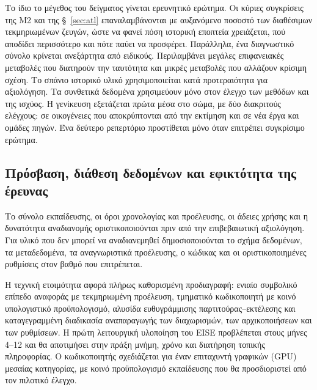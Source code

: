 \documentclass[11pt,a4paper]{article}
\begin{document}
Το ίδιο το μέγεθος του δείγματος γίνεται ερευνητικό ερώτημα. Οι κύριες συγκρίσεις της M2 και της §~\ref{sec:atl} επαναλαμβάνονται με αυξανόμενο ποσοστό των διαθέσιμων τεκμηριωμένων ζευγών, ώστε να φανεί πόση ιστορική εποπτεία χρειάζεται, πού αποδίδει περισσότερο και πότε παύει να προσφέρει. Παράλληλα, ένα διαγνωστικό σύνολο κρίνεται ανεξάρτητα από ειδικούς. Περιλαμβάνει μεγάλες επιφανειακές μεταβολές που διατηρούν την ταυτότητα και μικρές μεταβολές που αλλάζουν κρίσιμη σχέση. Το σπάνιο ιστορικό υλικό χρησιμοποιείται κατά προτεραιότητα για αξιολόγηση. Τα συνθετικά δεδομένα χρησιμεύουν μόνο στον έλεγχο των μεθόδων και της ισχύος. Η γενίκευση εξετάζεται πρώτα μέσα στο σώμα, με δύο διακριτούς ελέγχους: σε οικογένειες που αποκρύπτονται από την εκτίμηση και σε νέα έργα και ομάδες πηγών. Ένα δεύτερο ρεπερτόριο προστίθεται μόνο όταν επιτρέπει συγκρίσιμο ερώτημα.

\subsection{Πρόσβαση, διάθεση δεδομένων και εφικτότητα της έρευνας}\label{sec:data-rights}

Το σύνολο εκπαίδευσης, οι όροι χρονολογίας και προέλευσης, οι άδειες χρήσης και η δυνατότητα αναδιανομής οριστικοποιούνται πριν από την επιβεβαιωτική αξιολόγηση. Για υλικό που δεν μπορεί να αναδιανεμηθεί δημοσιοποιούνται το σχήμα δεδομένων, τα μεταδεδομένα, τα αναγνωριστικά προέλευσης, ο κώδικας και οι οριστικοποιημένες ρυθμίσεις στον βαθμό που επιτρέπεται.

Η τεχνική ετοιμότητα αφορά πλήρως καθορισμένη προδιαγραφή: ενιαίο συμβολικό επίπεδο αναφοράς με τεκμηριωμένη προέλευση, τμηματικό κωδικοποιητή με κοινό υπολογιστικό προϋπολογισμό, αλυσίδα ευθυγράμμισης παρτιτούρας--εκτέλεσης και καταγεγραμμένη διαδικασία αναπαραγωγής των διαχωρισμών, των αρχικοποιήσεων και των ρυθμίσεων. Η πρώτη λειτουργική υλοποίηση του EISE προβλέπεται στους μήνες 4--12 και θα αποτιμήσει στην πράξη μνήμη, χρόνο και διατήρηση τοπικής πληροφορίας. Ο κωδικοποιητής σχεδιάζεται για έναν επιταχυντή γραφικών (GPU) μεσαίας κατηγορίας, με κοινό προϋπολογισμό εκπαίδευσης που θα προσδιοριστεί από τον πιλοτικό έλεγχο.
\end{document}
